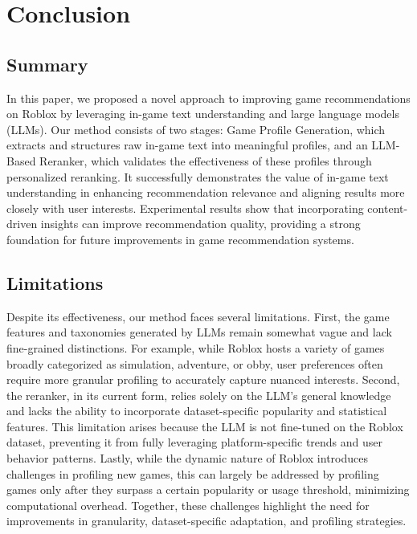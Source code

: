 \section{Conclusion}

\subsection{Summary}
In this paper, we proposed a novel approach to improving game recommendations on Roblox by leveraging in-game text understanding and large language models (LLMs). Our method consists of two stages: Game Profile Generation, which extracts and structures raw in-game text into meaningful profiles, and an LLM-Based Reranker, which validates the effectiveness of these profiles through personalized reranking. It successfully demonstrates the value of in-game text understanding in enhancing recommendation relevance and aligning results more closely with user interests. Experimental results show that incorporating content-driven insights can improve recommendation quality, providing a strong foundation for future improvements in game recommendation systems.

\subsection{Limitations}
Despite its effectiveness, our method faces several limitations. First, the game features and taxonomies generated by LLMs remain somewhat vague and lack fine-grained distinctions. For example, while Roblox hosts a variety of games broadly categorized as simulation, adventure, or obby, user preferences often require more granular profiling to accurately capture nuanced interests. Second, the reranker, in its current form, relies solely on the LLM's general knowledge and lacks the ability to incorporate dataset-specific popularity and statistical features. This limitation arises because the LLM is not fine-tuned on the Roblox dataset, preventing it from fully leveraging platform-specific trends and user behavior patterns. Lastly, while the dynamic nature of Roblox introduces challenges in profiling new games, this can largely be addressed by profiling games only after they surpass a certain popularity or usage threshold, minimizing computational overhead. Together, these challenges highlight the need for improvements in granularity, dataset-specific adaptation, and profiling strategies.

